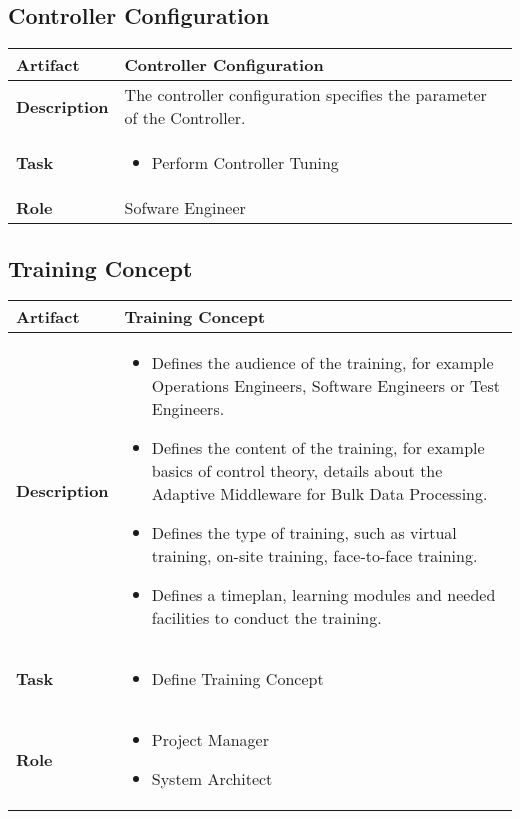\subsection{Controller Configuration}
\begin{minipage}{\textwidth}
 \label{table:ch6_Artifact_Controller_Configuration}
\begin{tabular}
	{|m{2cm}|m{10cm}|} \hline \bfseries Artifact & Controller Configuration\\
	\hline \bfseries Description & The controller configuration specifies the parameter of the Controller.\\
	\hline \bfseries Task & 
	\begin{itemize}
		\item Perform Controller Tuning
	\end{itemize}
	\\
	\hline \bfseries Role & Sofware Engineer\\
	\hline 
\end{tabular}
\end{minipage}

\subsection{Training Concept}
\begin{minipage}{\textwidth}
 \label{table:ch6_Artifact_Training_Concept}
\begin{tabular}
	{|m{2cm}|m{10cm}|} \hline \bfseries Artifact & Training Concept\\
	\hline \bfseries Description & 
	\begin{itemize}
		\item Defines the audience of the training, for example Operations Engineers, Software Engineers or Test Engineers.
		\item Defines the content of the training, for example basics of control theory, details about the Adaptive Middleware for Bulk Data Processing.
		\item Defines the type of training, such as virtual training, on-site training, face-to-face training. 
		\item Defines a timeplan, learning modules and needed facilities to conduct the training.
	\end{itemize}
	\\
	\hline \bfseries Task & 
	\begin{itemize}
		\item Define Training Concept
	\end{itemize}
	\\
	\hline \bfseries Role & 
	\begin{itemize}
		\item Project Manager
		\item System Architect
	\end{itemize}
	\\
	\hline 
\end{tabular}
\end{minipage}

